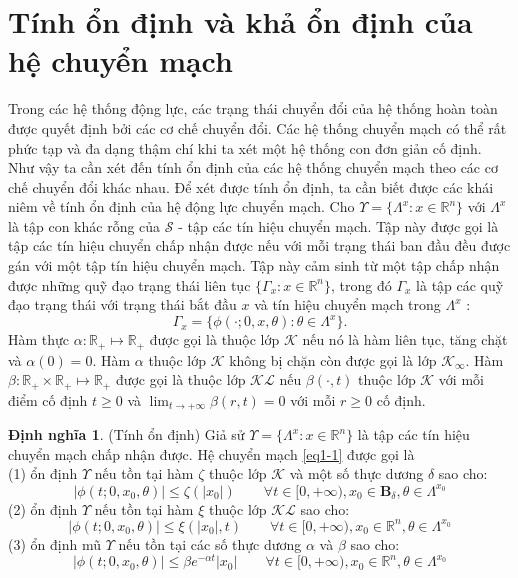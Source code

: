 \documentclass[14pt,a4paper,oneside]{report}		%
\theoremstyle{definition}
\newtheorem{define}[theorem]{Định nghĩa}
\begin{document}
\section{Tính ổn định và khả ổn định của hệ chuyển mạch}
Trong các hệ thống động lực, các trạng thái chuyển đổi của hệ thống hoàn toàn được quyết định bởi các cơ chế chuyển đổi. Các hệ thống chuyển mạch có thể rất phức tạp và đa dạng thậm chí khi ta xét một hệ thống con đơn giản cố định. Như vậy ta cần xét đến tính ổn định của các hệ thống chuyển mạch theo các cơ chế chuyển đổi khác nhau. Để xét được tính ổn định, ta cần biết được các khái niêm về tính ổn định của hệ động lực chuyển mạch.
Cho $\Upsilon = \{\Lambda^x:x\in\mathbb{R}^n\}$ với $\Lambda^x$ là tập con khác rỗng của $\mathcal{S}$ - tập các tín hiệu chuyển mạch. Tập này được gọi là tập các tín hiệu chuyển chấp nhận được nếu với mỗi trạng thái ban đầu đều được gán với một tập tín hiệu chuyển mạch. Tập này cảm sinh từ một tập chấp nhận được những quỹ đạo trạng thái liên tục $\{\Gamma_x:x\in\mathbb{R}^n\}$, trong đó $\Gamma_x$ là tập các quỹ đạo trạng thái với trạng thái bắt đầu $x$ và tín hiệu chuyển mạch trong $\Lambda^x$ :
$$\Gamma_x = \{\phi(\cdot;0,x,\theta):\theta\in\Lambda^x\}.$$
Hàm thực $\alpha :\mathbb{R}_+ \mapsto \mathbb{R}_+$ được gọi là thuộc lớp $\mathcal{K}$ nếu nó là hàm liên tục, tăng chặt và $\alpha(0)=0$. Hàm $\alpha$ thuộc lớp $\mathcal{K}$ không bị chặn còn được gọi là lớp $\mathcal{K}_\infty$. Hàm $\beta : \mathbb{R}_+ \times \mathbb{R}_+ \mapsto \mathbb{R}_+$ được gọi là thuộc lớp $\mathcal{KL}$ nếu $\beta(\cdot,t)$ thuộc lớp $\mathcal{K}$ với mỗi điểm cố định $t \geq 0$ và $\lim_{t\rightarrow +\infty}\beta(r,t)=0$ với mỗi $r\geq 0$ cố định.

\begin{define} \label{def1-1} (Tính ổn định) Giả sử $\Upsilon = \{\Lambda^x:x\in\mathbb{R}^n\}$ là tập các tín hiệu chuyển mạch chấp nhận được. Hệ chuyển mạch \ref{eq1-1} được gọi là \\
(1) ổn định $\Upsilon$ nếu tồn tại hàm $\zeta$ thuộc lớp $\mathcal{K}$ và một số thực dương $\delta$ sao cho:
$$|\phi(t;0,x_0,\theta)|\leq\zeta(|x_0|)\qquad\forall t \in [0,+\infty ), x_0 \in\mathbf{B}_\delta , \theta \in\Lambda^{x_0}$$
(2) ổn định $\Upsilon$ nếu tồn tại hàm $\xi$ thuộc lớp $\mathcal{KL}$ sao cho:
$$|\phi(t;0,x_0,\theta)|\leq\xi(|x_0|,t)\qquad\forall t \in [0,+\infty ), x_0 \in\mathbb{R}^n , \theta \in\Lambda^{x_0}$$
(3) ổn định mũ $\Upsilon$ nếu tồn tại các số thực dương $\alpha$ và $\beta$ sao cho:
$$|\phi(t;0,x_0,\theta)|\leq \beta e^{-\alpha t}|x_0|\qquad\forall t \in [0,+\infty ), x_0 \in\mathbb{R}^n , \theta \in\Lambda^{x_0}$$
\end{define}
\end{document}
